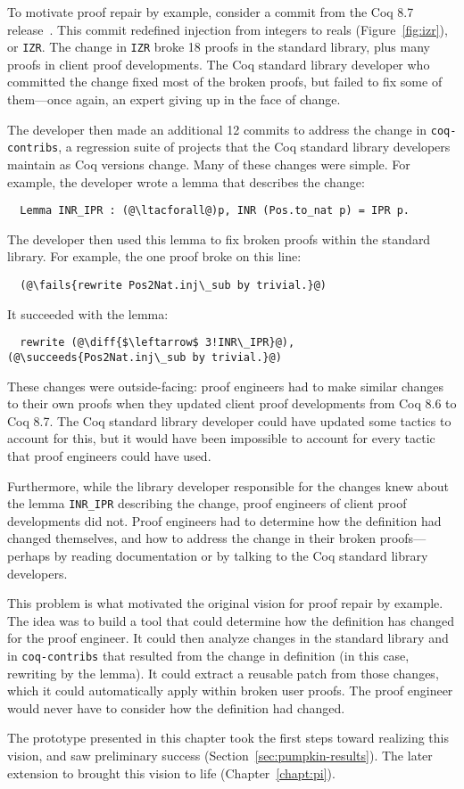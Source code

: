 To motivate proof repair by example, consider a commit from the Coq 8.7 release~\cite{coq87commit}.
This commit redefined injection from integers to reals (Figure~\ref{fig:izr}), or \lstinline{IZR}.
The change in \lstinline{IZR} broke 18 proofs in the standard library, plus many proofs in
client proof developments.
The Coq standard library developer who committed the change fixed most of the broken proofs,
but failed to fix some of them---once again, an expert giving up in the face of change.

The developer then made an additional 12 commits to address the change in \lstinline{coq-contribs},
a regression suite of projects that the Coq standard library developers maintain as Coq versions change.
Many of these changes were simple. For example, the developer wrote a lemma that describes the change:

\lstset{language=coq, aboveskip=3pt, belowskip=3pt}
\begin{lstlisting}
  Lemma INR_IPR : (@\ltacforall@)p, INR (Pos.to_nat p) = IPR p.
\end{lstlisting}
The developer then used this lemma to fix broken proofs within the standard library. 
For example, the one proof broke on this line:

\begin{lstlisting}
  (@\fails{rewrite Pos2Nat.inj\_sub by trivial.}@)
\end{lstlisting}
It succeeded with the lemma:

\begin{lstlisting}
  rewrite (@\diff{$\leftarrow$ 3!INR\_IPR}@), (@\succeeds{Pos2Nat.inj\_sub by trivial.}@)
\end{lstlisting}
These changes were outside-facing: proof engineers had to make similar changes to their own proofs when
they updated client proof developments from Coq 8.6 to Coq 8.7.
The Coq standard library developer could have updated some tactics to account for this, but it 
would have been impossible to account for every tactic that proof engineers could have used.

Furthermore, while the library developer responsible for the changes knew about the lemma \lstinline{INR_IPR}
describing the change, proof engineers of client proof developments did not. Proof engineers
had to determine how the definition had changed themselves, and how to address the change in their broken proofs---perhaps 
by reading documentation or by talking to the Coq standard library developers. 

This problem is what motivated the original vision for proof repair by example.
The idea was to build a tool that could determine how the definition has changed for the proof engineer.
It could then analyze changes in the standard library and in \lstinline{coq-contribs}
that resulted from the change in definition (in this case, rewriting by the lemma).
It could extract a reusable patch from those changes, which it could automatically apply within broken user proofs. %
The proof engineer would never have to consider how the definition had changed.

The \sysname prototype presented in this chapter took the first steps toward realizing this vision,
and saw preliminary success (Section~\ref{sec:pumpkin-results}).
The later \toolnamec extension to \sysnamelong brought this vision to life (Chapter~\ref{chapt:pi}).


